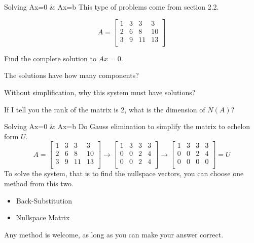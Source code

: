 \documentclass{beamer}
\begin{document}
\begin{frame}{Solving Ax=0 \& Ax=b}
This type of problems come from section 2.2.
\begin{example}
\begin{equation*}
    A=\left[ \begin{matrix}
        1&		3&		3&		3\\
        2&		6&		8&		10\\
        3&		9&		11&		13\\
    \end{matrix} \right]
\end{equation*}

Find the complete solution to $Ax=0$.
\end{example}

The solutions have how many components?

\vspace{3pt}
Without simplification, why this system must have solutions?

\vspace{3pt}
If I tell you the rank of the matrix is 2, what is the dimension of $N(A)$?
\end{frame}

\begin{frame}{Solving Ax=0 \& Ax=b}
Do Gauss elimination to simplify the matrix to echelon form $U$.
    \begin{equation*}
        A=\left[ \begin{matrix}
            1&		3&		3&		3\\
            2&		6&		8&		10\\
            3&		9&		11&		13\\
        \end{matrix} \right] \rightarrow \left[ \begin{matrix}
            1&		3&		3&		3\\
            0&		0&		2&		4\\
            0&		0&		2&		4\\
        \end{matrix} \right] \rightarrow \left[ \begin{matrix}
            1&		3&		3&		3\\
            0&		0&		2&		4\\
            0&		0&		0&		0\\
        \end{matrix} \right] =U
    \end{equation*}
To solve the system, that is to find the nullspace vectors, you can choose one method from this two.
\begin{itemize}
    \item Back-Substitution
    \item Nullspace Matrix
\end{itemize}

Any method is welcome, as long as you can make your answer correct.
\end{frame}
\end{document}
